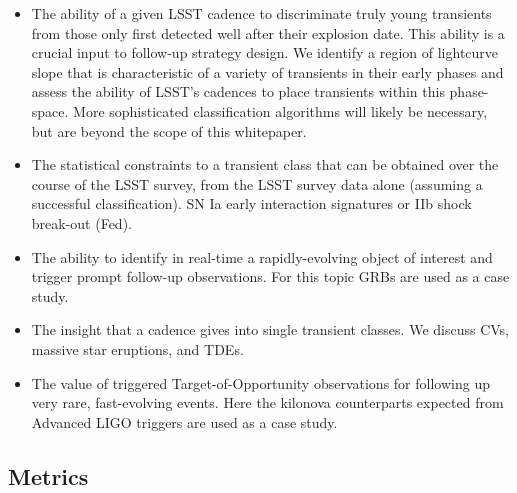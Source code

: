 \begin{itemize}
\item
  The ability of a given LSST cadence to discriminate truly young
  transients from those only first detected well after their explosion date.  
  This ability is a crucial input to follow-up strategy design.
  We identify a region of lightcurve slope
  that is characteristic of a
  variety of transients in their early phases and assess the ability of LSST's
  cadences to place transients within this phase-space. 
  More sophisticated classification algorithms will likely be necessary, but
  are beyond the scope of this whitepaper.
\item 
  The statistical constraints to a transient class that can be obtained
  over the course of the LSST survey, from the LSST survey data alone
  (assuming a successful classification). SN Ia early interaction
  signatures or IIb shock break-out (Fed).
\item
  The ability to identify in real-time a rapidly-evolving 
  object of interest and
  trigger prompt follow-up observations. For this topic GRBs are used as
  a case study. 
\item
  The insight that a cadence gives into single transient classes. We
  discuss CVs, massive star eruptions, and TDEs.
  \item
	  The value of triggered Target-of-Opportunity observations for
	  following up very rare, fast-evolving events.   Here the kilonova
	  counterparts expected from Advanced LIGO triggers are used as a
	  case study.

\end{itemize}



\subsection{Metrics}
\label{sec:\chpname:metrics}

